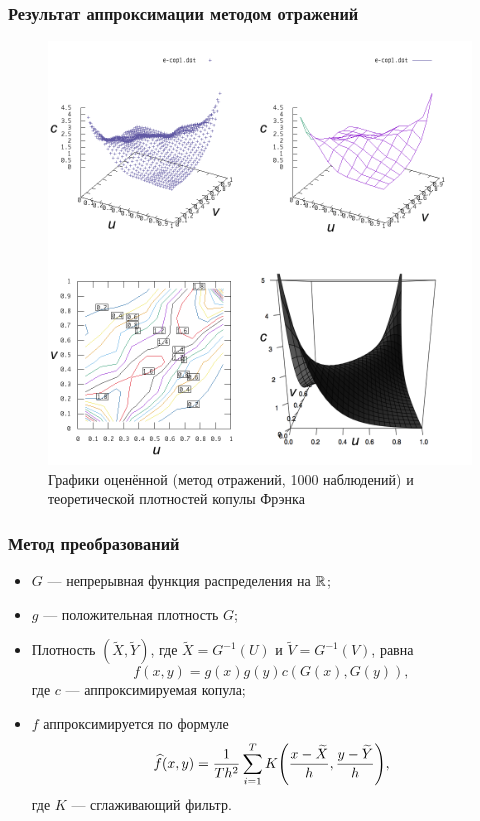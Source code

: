 \documentclass[11pt]{beamer}
\begin{document}
\begin{frame}
\begin{center}
\frametitle{Результат аппроксимации методом отражений}
\begin{figure}[H]
  \centering
  \includegraphics[width=.56\textwidth]{FrankMirror.png}
  \caption{Графики оценённой (метод отражений, 1000 наблюдений) и теоретической плотностей копулы Фрэнка}
\end{figure}
\end{center}
\end{frame}

\begin{frame}
\frametitle{Метод преобразований}
\begin{itemize}
  \item $G$ --- непрерывная функция распределения на $\mathbb{R}$;
  \item $g$ --- положительная плотность $G$;
  \item Плотность $(\widetilde{X}, \widetilde{Y})$, где $\widetilde{X} = G^{-1}(U)$ и $\widetilde{V} = G^{-1}(V)$, равна
\begin{equation}\label{eq:transform_method}
f(x, y) = g(x)g(y)c(G(x), G(y)),
\end{equation}
где $c$ --- аппроксимируемая копула;
\item $f$ аппроксимируется по формуле
\begin{equation}
\widehat{f}(x, y) = \frac{1}{T h^2} \sum_{i=1}^T K\brts*{\frac{x - \widetilde{X}}{h}, \frac{y - \widetilde{Y}}{h}},
\end{equation}
где $K$ --- сглаживающий фильтр.
\end{itemize}
\end{frame}
\end{document}
